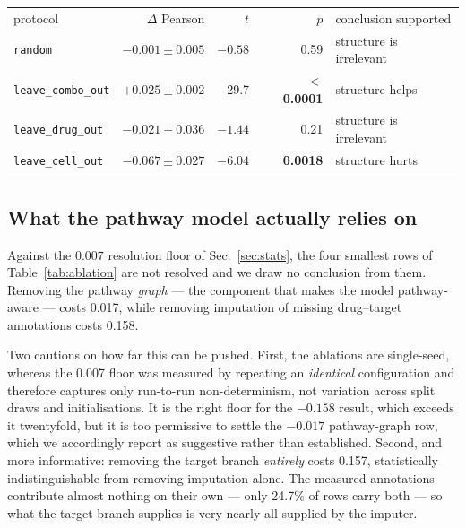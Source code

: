 \documentclass{ws-procs11x85}
\begin{document}
\begin{table}[ht]
{\begin{tabular}{@{}lrrrl@{}} \toprule
protocol & $\Delta$ Pearson & $t$ & $p$ & conclusion supported \\ \colrule
{\tt random} & $-0.001 \pm 0.005$ & $-0.58$ & 0.59 & structure is irrelevant \\
{\tt leave\_combo\_out} & $\mathbf{+0.025 \pm 0.002}$ & 29.7 & \textbf{$<$ 0.0001} & structure helps \\
{\tt leave\_drug\_out} & $-0.021 \pm 0.036$ & $-1.44$ & 0.21 & structure is irrelevant \\
{\tt leave\_cell\_out} & $-0.067 \pm 0.027$ & $-6.04$ & \textbf{0.0018} & structure hurts \\ \botrule
\end{tabular}}
\label{tab:verdict}
\end{table}

\subsection{What the pathway model actually relies on}\label{sec:ablation}

Against the 0.007 resolution floor of Sec.~\ref{sec:stats}, the four smallest
rows of Table~\ref{tab:ablation} are not resolved and we draw no conclusion from
them. Removing the pathway \emph{graph} --- the component that makes the model
pathway-aware --- costs 0.017, while removing imputation of missing drug--target
annotations costs 0.158.

Two cautions on how far this can be pushed. First, the ablations are single-seed,
whereas the 0.007 floor was measured by repeating an \emph{identical}
configuration and therefore captures only run-to-run non-determinism, not
variation across split draws and initialisations. It is the right floor for the
$-0.158$ result, which exceeds it twentyfold, but it is too permissive to settle
the $-0.017$ pathway-graph row, which we accordingly report as suggestive rather
than established. Second, and more informative: removing the target branch
\emph{entirely} costs 0.157, statistically indistinguishable from removing
imputation alone. The measured annotations contribute almost nothing on their own
--- only 24.7\% of rows carry both --- so what the target branch supplies is very
nearly all supplied by the imputer.
\end{document}
